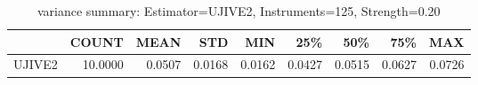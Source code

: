 \begin{table}[ht]
\centering
\caption{variance summary: Estimator=UJIVE2, Instruments=125, Strength=0.20}
\begin{tabular}{lrrrrrrrr}
\toprule
 & COUNT & MEAN & STD & MIN & 25\% & 50\% & 75\% & MAX \\
\midrule
UJIVE2 & 10.0000 & 0.0507 & 0.0168 & 0.0162 & 0.0427 & 0.0515 & 0.0627 & 0.0726 \\
\bottomrule
\end{tabular}
\end{table}
